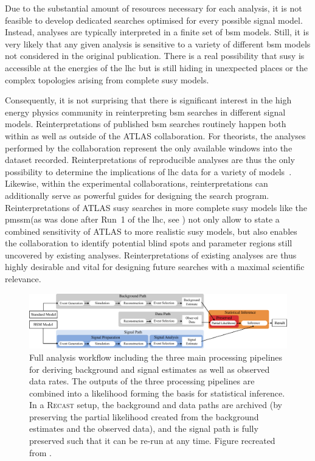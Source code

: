 Due to the substantial amount of resources necessary for each analysis, it is not feasible to develop dedicated searches optimised for every possible signal model. Instead, analyses are typically interpreted in a finite set of \gls{bsm} models. Still, it is very likely that any given analysis is sensitive to a variety of different \gls{bsm} models not considered in the original publication. There is a real possibility that \gls{susy} is accessible at the energies of the \gls{lhc} but is still hiding in unexpected places or the complex topologies arising from complete \gls{susy} models. 

Consequently, it is not surprising that there is significant interest in the high energy physics community in reinterpreting \gls{bsm} searches in different signal models. Reinterpretations of published \gls{bsm} searches routinely happen both within as well as outside of the ATLAS collaboration. For theorists, the analyses performed by the collaboration represent the only available windows into the dataset recorded. Reinterpretations of reproducible analyses are thus the only possibility to determine the implications of \gls{lhc} data for a variety of models~\cite{reinterpretation_workshop}. Likewise, within the experimental collaborations, reinterpretations can additionally serve as powerful guides for designing the search program. Reinterpretations of ATLAS \gls{susy} searches in more complete \gls{susy} models like the \gls{pmssm}(as was done after Run~1 of the \gls{lhc}, see \cite{pMSSM-scan-run1:2015baa}) not only allow to state a combined sensitivity of ATLAS to more realistic \gls{susy} models, but also enables the collaboration to identify potential blind spots and parameter regions still uncovered by existing analyses. Reinterpretations of existing analyses are thus highly desirable and vital for designing future searches with a maximal scientific relevance.  

 \begin{figure}
	\centering\includegraphics[width=\textwidth]{pipeline}
	\caption{Full analysis workflow including the three main processing pipelines for deriving background and signal estimates as well as observed data rates. The outputs of the three processing pipelines are combined into a likelihood forming the basis for statistical inference. In a \textsc{Recast} setup, the background and data paths are archived (\eg by preserving the partial likelihood created from the background estimates and the observed data), and the signal path is fully preserved such that it can be re-run at any time. Figure recreated from \cite{ATL-PHYS-PUB-2019-032}.}
	\label{fig:pipeline_analysis}
\end{figure}

